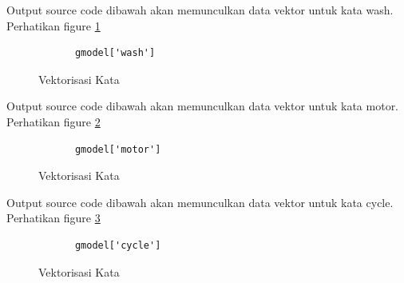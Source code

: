 \begin{enumerate}
Output source code dibawah akan memunculkan data vektor untuk kata wash. Perhatikan figure \ref{YNC5-14}

		\begin{verbatim}
			gmodel['wash']
		\end{verbatim}

		\begin{figure}[!htbp]
			\caption{Vektorisasi Kata}
			\label{YNC5-14}
		\end{figure}
Output source code dibawah akan memunculkan data vektor untuk kata motor. Perhatikan figure \ref{YNC5-15}

		\begin{verbatim}
			gmodel['motor']
		\end{verbatim}

		\begin{figure}[!htbp]
			\caption{Vektorisasi Kata}
			\label{YNC5-15}
		\end{figure}

Output source code dibawah akan memunculkan data vektor untuk kata cycle. Perhatikan figure \ref{YNC5-16}

		\begin{verbatim}
			gmodel['cycle']
		\end{verbatim}

		\begin{figure}[!htbp]
			\caption{Vektorisasi Kata}
			\label{YNC5-16}
		\end{figure}


\end{enumerate}
